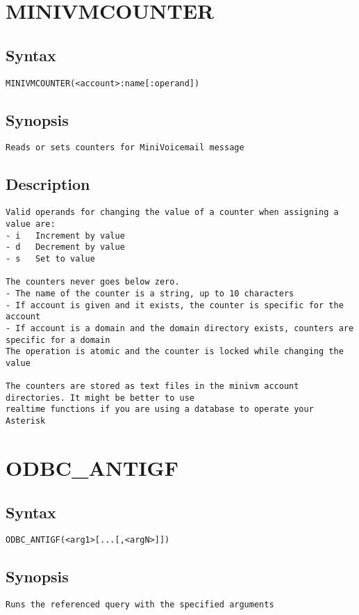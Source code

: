 \section{MINIVMCOUNTER}
\subsection{Syntax}
\begin{verbatim}
MINIVMCOUNTER(<account>:name[:operand])
\end{verbatim}
\subsection{Synopsis}
\begin{verbatim}
Reads or sets counters for MiniVoicemail message
\end{verbatim}
\subsection{Description}
\begin{verbatim}
Valid operands for changing the value of a counter when assigning a value are:
- i   Increment by value
- d   Decrement by value
- s   Set to value

The counters never goes below zero.
- The name of the counter is a string, up to 10 characters
- If account is given and it exists, the counter is specific for the account
- If account is a domain and the domain directory exists, counters are specific for a domain
The operation is atomic and the counter is locked while changing the value

The counters are stored as text files in the minivm account directories. It might be better to use
realtime functions if you are using a database to operate your Asterisk

\end{verbatim}


\section{ODBC\_ANTIGF}
\subsection{Syntax}
\begin{verbatim}
ODBC_ANTIGF(<arg1>[...[,<argN>]])
\end{verbatim}
\subsection{Synopsis}
\begin{verbatim}
Runs the referenced query with the specified arguments
\end{verbatim}

